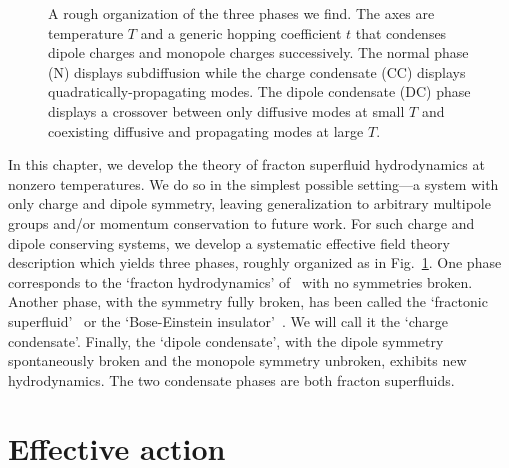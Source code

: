 \begin{figure}[th!]
    \centering
{}
    \caption[A rough organization of the three hydrodynamic phases]{A rough organization of the three phases we find. The axes are temperature $T$ and a generic hopping coefficient $t$ that condenses dipole charges and monopole charges successively. The normal phase (N) displays subdiffusion while the charge condensate (CC) displays quadratically-propagating modes. The dipole condensate (DC) phase displays a crossover between only diffusive modes at small $T$ and coexisting diffusive and propagating modes at large $T$.}
    \label{fig:phasediagram}
\end{figure}

In this chapter, we develop the theory of fracton superfluid hydrodynamics at nonzero temperatures. We do so in the simplest possible setting---a system with only charge and dipole symmetry, leaving generalization to arbitrary multipole groups and/or momentum conservation to future work. 
For such charge and dipole conserving systems, we develop a systematic effective field theory description which yields three phases, roughly organized as in Fig.~\ref{fig:phasediagram}. One phase corresponds to the `fracton hydrodynamics' of~\cite{Gromov2020Fracton} with no symmetries broken. Another phase, with the symmetry fully broken, has been called the `fractonic superfluid'~\cite{Yuan2020Fractonic} or the `Bose-Einstein insulator'~\cite{Lake2022Dipolar}. We will call it the `charge condensate'. Finally, the `dipole condensate', with the dipole symmetry spontaneously broken and the monopole symmetry unbroken, exhibits new hydrodynamics. The two condensate phases are both fracton superfluids.

\section{Effective action}

